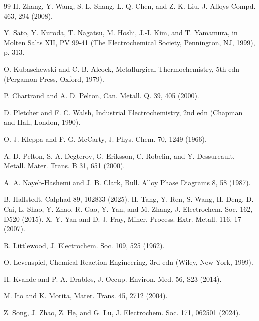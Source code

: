 \documentclass[11pt]{article}
\begin{document}
\begin{thebibliography}{99}
 H. Zhang, Y. Wang, S. L. Shang, L.-Q. Chen, and Z.-K. Liu, J. Alloys Compd. 463, 294 (2008).

 Y. Sato, Y. Kuroda, T. Nagatsu, M. Hoshi, J.-I. Kim, and T. Yamamura, in Molten Salts XII, PV 99-41 (The Electrochemical Society, Pennington, NJ, 1999), p. 313.

 O. Kubaschewski and C. B. Alcock, Metallurgical Thermochemistry, 5th edn (Pergamon Press, Oxford, 1979).

 P. Chartrand and A. D. Pelton, Can. Metall. Q. 39, 405 (2000).

 D. Pletcher and F. C. Walsh, Industrial Electrochemistry, 2nd edn (Chapman and Hall, London, 1990).

 O. J. Kleppa and F. G. McCarty, J. Phys. Chem. 70, 1249 (1966).

 A. D. Pelton, S. A. Degterov, G. Eriksson, C. Robelin, and Y. Dessureault, Metall. Mater. Trans. B 31, 651 (2000).

 A. A. Nayeb-Hashemi and J. B. Clark, Bull. Alloy Phase Diagrams 8, 58 (1987).

 B. Hallstedt, Calphad 89, 102833 (2025).
 H. Tang, Y. Ren, S. Wang, H. Deng, D. Cai, L. Shao, Y. Zhao, R. Gao, Y. Yan, and M. Zhang, J. Electrochem. Soc. 162, D520 (2015).
 X. Y. Yan and D. J. Fray, Miner. Process. Extr. Metall. 116, 17 (2007).

 R. Littlewood, J. Electrochem. Soc. 109, 525 (1962).

 O. Levenspiel, Chemical Reaction Engineering, 3rd edn (Wiley, New York, 1999).

 H. Kvande and P. A. Drabl{\o}s, J. Occup. Environ. Med. 56, S23 (2014).

 M. Ito and K. Morita, Mater. Trans. 45, 2712 (2004).

 Z. Song, J. Zhao, Z. He, and G. Lu, J. Electrochem. Soc. 171, 062501 (2024).

\end{thebibliography}
\end{document}
